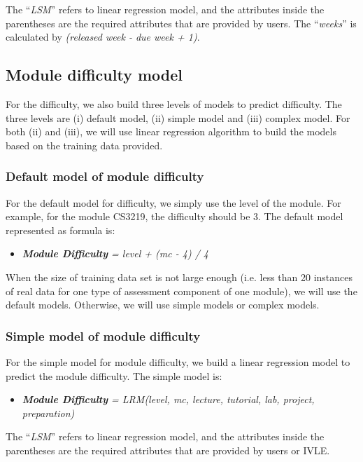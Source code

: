 \documentclass[fyp]{socreport}
\begin{document}
The “\textit{LSM}” refers to linear regression model, and the attributes inside the parentheses are the required attributes that are provided by users. The “\textit{weeks}” is calculated by \textit{(released week - due week + 1)}.

\subsection{Module difficulty model}
For the difficulty, we also build three levels of models to predict difficulty. The three levels are (i) default model, (ii) simple model and (iii) complex model. For both (ii) and (iii), we will use linear regression algorithm to build the models based on the training data provided.

\subsubsection{Default model of module difficulty}
For the default model for difficulty, we simply use the level of the module. For example, for the module CS3219, the difficulty should be 3. The default model represented as formula is:
\begin{itemize}
	\item \textit{\textbf{Module Difficulty} = level + (mc - 4) / 4}
\end{itemize}

When the size of training data set is not large enough (i.e. less than 20 instances of real data for one type of assessment component of one module), we will use the default models. Otherwise, we will use simple models or complex models.

\subsubsection{Simple model of module difficulty}
For the simple model for module difficulty, we build a linear regression model to predict the module difficulty. The simple model is:
\begin{itemize}
	\item \textit{\textbf{Module Difficulty} = LRM(level, mc, lecture, tutorial, lab, project, preparation)}
\end{itemize}

The “\textit{LSM}” refers to linear regression model, and the attributes inside the parentheses are the required attributes that are provided by users or IVLE.
\end{document}
